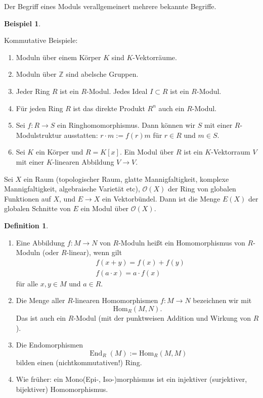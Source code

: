 \documentclass[reqno,12pt]{article}
\numberwithin{equation}{section}
\newcommand{\bZ}{\mathbb{Z}}
\newcommand{\cO}{\mathcal{O}}
\newcommand{\Hom}{\text{Hom}}
\theoremstyle{plain}
\theoremstyle{definition}
\newtheorem{definition}[thm]{Definition}
\newtheorem{example}[thm]{Beispiel}
\newcommand{\End}{\operatorname{End}}
\begin{document}
Der Begriff eines Moduls verallgemeinert mehrere bekannte Begriffe.

\begin{example}
\

\noindent Kommutative Beispiele:
  \begin{enumerate}
    \item Moduln über einem Körper $K$ sind $K$-Vektorräume.
    \item Moduln über $\bZ$ sind abelsche Gruppen.
    \item Jeder Ring $R$ ist ein $R$-Modul. Jedes Ideal $I \subset R$ ist ein $R$-Modul.
    \item Für jeden Ring $R$ ist das direkte Produkt $R^n$ auch ein $R$-Modul.
    \item Sei $f \colon R \to S$ ein Ringhomomorphismus. Dann können wir $S$ mit einer $R$-Modulstruktur ausstatten: $r \cdot m := f(r)m$ für $r \in R$ und $m \in S$.
    \item Sei $K$ ein Körper und $R=K[x]$. Ein Modul über $R$ ist ein $K$-Vektorraum $V$ mit einer $K$-linearen Abbildung $V \to V$.
  \end{enumerate}
\end{example}

 Sei $X$ ein Raum (topologischer Raum, glatte Mannigfaltigkeit, komplexe Mannigfaltigkeit, algebraische Varietät etc), $\cO(X)$ der Ring von globalen Funktionen auf $X$, und $E \to X$ ein Vektorbündel. Dann ist die Menge $E(X)$ der globalen Schnitte von $E$ ein Modul über $\cO(X)$.

\newpage

\begin{definition}
\
\begin{enumerate}
  \item Eine Abbildung $f \colon M \to N$ von $R$-Moduln heißt ein {\sf Homomorphismus von $R$-Moduln} (oder $R$-linear), wenn gilt
  \begin{align*}
    & f(x+y) = f(x) + f(y) \\
    & f(a \cdot x) = a \cdot f(x)
  \end{align*}
  für alle $x,y \in M$ und $a \in R$.

  \item Die Menge aller $R$-linearen Homomorphismen $f \colon M \to N$ bezeichnen wir mit
  $$
  \Hom_R(M,N).
  $$
  Das ist auch ein $R$-Modul (mit der punktweisen Addition und Wirkung von $R$).

  \item Die {\sf Endomorphismen}
  $$
  \End_R(M):= \Hom_R(M,M)
  $$
  bilden einen (nichtkommutativen!) Ring.

  \item Wie früher: ein Mono(Epi-, Iso-)morphismus ist ein injektiver (surjektiver, bijektiver) Homomorphismus.
\end{enumerate}

\end{definition}
\end{document}
